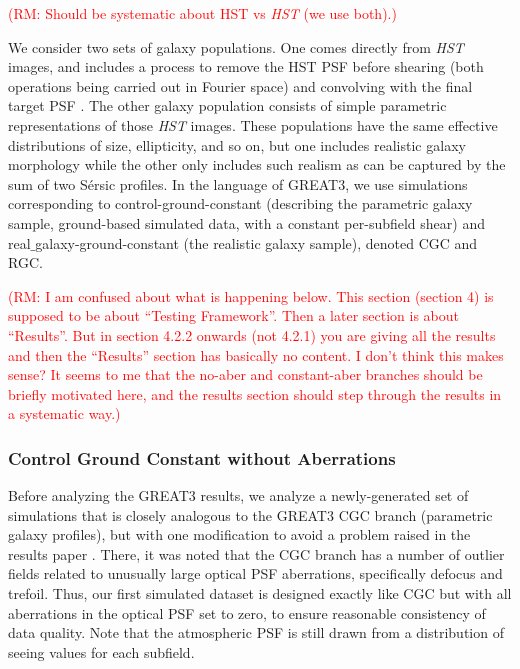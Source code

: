 \documentclass[iop]{emulateapj}
\newcommand\rmcomment[1]{\textcolor{red}{(RM: #1)}}
\begin{document}
\rmcomment{Should be systematic about HST vs {\it HST} (we use both).}

We consider two sets of galaxy populations.  One comes directly from
{\it HST} images, and includes a process to remove the HST PSF before
shearing (both operations being carried out in Fourier space) and
convolving with the final target PSF \citep{2012MNRAS.420.1518M}.  The
other galaxy population consists of simple parametric representations
of those {\it HST} images.  These populations have the same effective
distributions of size, ellipticity, and so on, but one includes
realistic galaxy morphology while the other only includes such realism
as can be captured by the sum of two S\'{e}rsic profiles.  In the
language of GREAT3, we use simulations corresponding to
control-ground-constant (describing the parametric galaxy sample,
ground-based simulated data, with a constant per-subfield shear) and
real$\_$galaxy-ground-constant (the realistic galaxy sample), denoted
CGC and RGC.

\rmcomment{I am confused about what is happening below.  This section (section 4) is supposed to be
  about ``Testing Framework''.  Then a later section is about ``Results''.  But in section 4.2.2
  onwards (not 4.2.1) you are giving all the results and then the ``Results'' section has basically
  no content.  I don't think this makes sense?  It seems to me that the no-aber and constant-aber
  branches should be briefly motivated here, and the results section should step through the results
  in a systematic way.}

\subsubsection{Control Ground Constant without Aberrations}

Before analyzing the GREAT3 results, we analyze a newly-generated set
of simulations that is closely analogous to the GREAT3 CGC branch
(parametric galaxy profiles), but with one modification to avoid a
problem raised in the results paper \citep{2015MNRAS.450.2963M}.
There, it was noted that the CGC branch has a number of outlier fields
related to unusually large optical PSF aberrations, specifically
defocus and trefoil.  Thus, our first simulated dataset is designed
exactly like CGC but with all aberrations in the optical PSF set to
zero, to ensure reasonable consistency of data quality.  Note that the
atmospheric PSF is still drawn from a distribution of seeing values
for each subfield.
\end{document}
